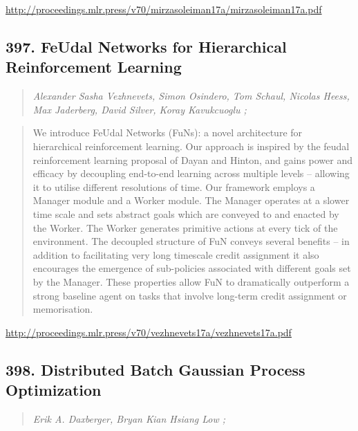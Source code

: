 \documentclass{article}
\begin{document}
\href{http://proceedings.mlr.press/v70/mirzasoleiman17a/mirzasoleiman17a.pdf}{http://proceedings.mlr.press/v70/mirzasoleiman17a/mirzasoleiman17a.pdf}

\subsection{397. FeUdal Networks for Hierarchical Reinforcement Learning}

\begin{quote}
\footnotesize{\textit{Alexander Sasha Vezhnevets, Simon Osindero, Tom Schaul, Nicolas Heess, Max Jaderberg, David Silver, Koray Kavukcuoglu ;}}

\end{quote}

\begin{quote}
    We introduce FeUdal Networks (FuNs): a novel architecture for hierarchical reinforcement learning. Our approach is inspired by the feudal reinforcement learning proposal of Dayan and Hinton, and gains power and efficacy by decoupling end-to-end learning across multiple levels – allowing it to utilise different resolutions of time. Our framework employs a Manager module and a Worker module. The Manager operates at a slower time scale and sets abstract goals which are conveyed to and enacted by the Worker. The Worker generates primitive actions at every tick of the environment. The decoupled structure of FuN conveys several benefits – in addition to facilitating very long timescale credit assignment it also encourages the emergence of sub-policies associated with different goals set by the Manager. These properties allow FuN to dramatically outperform a strong baseline agent on tasks that involve long-term credit assignment or memorisation.  
\end{quote}

\href{http://proceedings.mlr.press/v70/vezhnevets17a/vezhnevets17a.pdf}{http://proceedings.mlr.press/v70/vezhnevets17a/vezhnevets17a.pdf}

\subsection{398. Distributed Batch Gaussian Process Optimization}

\begin{quote}
\footnotesize{\textit{Erik A. Daxberger, Bryan Kian Hsiang Low ;}}

\end{quote}
\end{document}
